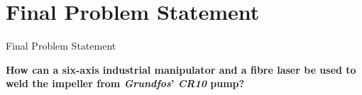 
\section{Final Problem Statement}
\begin{frame}{Final Problem Statement}
\begin{center}
\textbf{
How can a six-axis industrial manipulator and a fibre laser be used to weld the impeller from \textit{Grundfos}' \textit{CR10} pump?
}\end{center}
\end{frame}